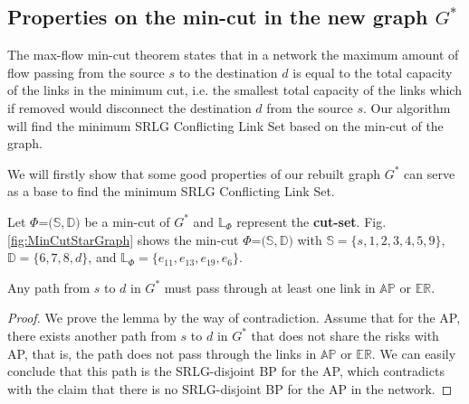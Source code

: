\subsection{Properties on the min-cut in the new graph $G^*$}
\label{subsec:Properties on the min-cut in the new graph $G^*$}
The max-flow min-cut theorem states that in a  network the maximum amount of flow passing from the source $s$ to the destination $d$ is equal to the total capacity of the links in the minimum cut, i.e. the smallest total capacity of the links which if removed would disconnect the destination $d$ from the source $s$.  Our algorithm will find the minimum SRLG Conflicting Link Set based on the min-cut of the graph.

We will firstly show that some good properties of our rebuilt graph $G^*$ can serve as a base to find the minimum SRLG Conflicting Link Set.


Let $\Phi$=${(\mathbb{S}},{\mathbb{D}})$ be a min-cut of $G^*$ and $\mathbb{L}_{\Phi}$  represent the \textbf{cut-set}. Fig.\ref{fig:MinCutStarGraph} shows the min-cut $\Phi$=${(\mathbb{S}},{\mathbb{D}})$ with ${\mathbb{S}}=\{s, 1, 2, 3, 4, 5, 9\}$,  ${\mathbb{D}}=\{6, 7, 8, d\}$, and $\mathbb{L}_{\Phi}=\{e_{11}, e_{13}, e_{19}, e_6\}$.





\begin{lemma}
\label{le:lemma1}
    Any path from $s$ to $d$ in $G^*$ must pass through at least one link in $\mathbb{AP}$ or $\mathbb{\mathbb{ER}}$.
\end{lemma}
\begin{proof}
We prove the lemma by the way of contradiction. Assume that for the AP, there exists another path from  $s$ to $d$ in $G^*$ that does not share the risks with  AP, that is, the path does not pass through the links in $\mathbb{AP}$ or $\mathbb{\mathbb{ER}}$. We can easily conclude that this path is the SRLG-disjoint BP for the AP, which contradicts with the claim that there is no SRLG-disjoint BP for the AP in the network.
\end{proof}

